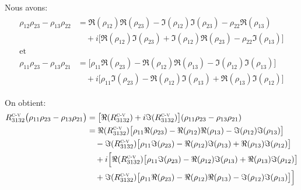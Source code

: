 \documentclass[12pt,a4paper,openany,oneside]{book}
\begin{document}
{{{{{{Nous avons:
\begin{eqnarray*}
\begin{split}
\rho_{12}\rho_{23} - \rho_{13}\rho_{22} &= \Re(\rho_{12})\Re(\rho_{23})-\Im(\rho_{12})\Im(\rho_{23})-\rho_{22}\Re(\rho_{13})\\
&\quad +i\big[\Re(\rho_{12})\Im(\rho_{23})+\Im(\rho_{12})\Re(\rho_{23})-\rho_{22}\Im(\rho_{13})\big]\\
\textrm{et}&\\
 \rho_{11}\rho_{23} - \rho_{13}\rho_{21} &= \big[\rho_{11}\Re(\rho_{23})-\Re(\rho_{12})\Re(\rho_{13})-\Im(\rho_{12})\Im(\rho_{13})\big]\\
&\quad +i\big[\rho_{11}\Im(\rho_{23})-\Re(\rho_{12})\Im(\rho_{13})+\Re(\rho_{13})\Im(\rho_{12})\big]
\end{split}
\end{eqnarray*}

On obtient:
\begin{eqnarray*}
\begin{split}
R^{\textsc{c-v}}_{3132}\big(\rho_{11}\rho_{23} - \rho_{13}\rho_{21}\big) &= \big[\Re(R^{\textsc{c-v}}_{3132})+i\Im(R^{\textsc{c-v}}_{3132})\big](\rho_{11}\rho_{23} - \rho_{13}\rho_{21})\\
&= \Re(R^{\textsc{c-v}}_{3132})\big[\rho_{11}\Re(\rho_{23})-\Re(\rho_{12})\Re(\rho_{13})-\Im(\rho_{12})\Im(\rho_{13})\big]\\
&\quad -\Im(R^{\textsc{c-v}}_{3132})\big[\rho_{11}\Im(\rho_{23})-\Re(\rho_{12})\Im(\rho_{13})+\Re(\rho_{13})\Im(\rho_{12})\big]\\
&\quad +i\Big[\Re(R^{\textsc{c-v}}_{3132})\big[\rho_{11}\Im(\rho_{23})-\Re(\rho_{12})\Im(\rho_{13})+\Re(\rho_{13})\Im(\rho_{12})\big]\\
&\quad +\Im(R^{\textsc{c-v}}_{3132})\big[\rho_{11}\Re(\rho_{23})-\Re(\rho_{12})\Re(\rho_{13})-\Im(\rho_{12})\Im(\rho_{13})\big]\Big]
\end{split}
\end{eqnarray*}

}}}}}}
\end{document}
